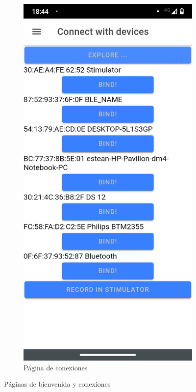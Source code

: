 \begin{figure}
\begin{subfigure}{.5\textwidth}
  \includegraphics[width=.8\linewidth]{figs/02_connection.png}
  \caption{Página de conexiones}
  \label{fig:connections}
\end{subfigure}
\caption{Páginas de bienvenida y conexiones}
\label{fig:welcomeConnect}
\end{figure}
